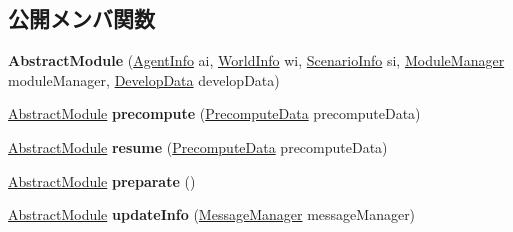 \subsection*{公開メンバ関数}
\begin{DoxyCompactItemize}
\item 
\hypertarget{classadf_1_1component_1_1module_1_1AbstractModule_a78b7aca7664343cd591f726b3b495e2d}{}\label{classadf_1_1component_1_1module_1_1AbstractModule_a78b7aca7664343cd591f726b3b495e2d} 
{\bfseries Abstract\+Module} (\hyperlink{classadf_1_1agent_1_1info_1_1AgentInfo}{Agent\+Info} ai, \hyperlink{classadf_1_1agent_1_1info_1_1WorldInfo}{World\+Info} wi, \hyperlink{classadf_1_1agent_1_1info_1_1ScenarioInfo}{Scenario\+Info} si, \hyperlink{classadf_1_1agent_1_1module_1_1ModuleManager}{Module\+Manager} module\+Manager, \hyperlink{classadf_1_1agent_1_1develop_1_1DevelopData}{Develop\+Data} develop\+Data)
\item 
\hypertarget{classadf_1_1component_1_1module_1_1AbstractModule_a26caa8a0a250dafb548c1a5d038597e7}{}\label{classadf_1_1component_1_1module_1_1AbstractModule_a26caa8a0a250dafb548c1a5d038597e7} 
\hyperlink{classadf_1_1component_1_1module_1_1AbstractModule}{Abstract\+Module} {\bfseries precompute} (\hyperlink{classadf_1_1agent_1_1precompute_1_1PrecomputeData}{Precompute\+Data} precompute\+Data)
\item 
\hypertarget{classadf_1_1component_1_1module_1_1AbstractModule_a2bcfc3ab4e5d5764a0cce91580fa6811}{}\label{classadf_1_1component_1_1module_1_1AbstractModule_a2bcfc3ab4e5d5764a0cce91580fa6811} 
\hyperlink{classadf_1_1component_1_1module_1_1AbstractModule}{Abstract\+Module} {\bfseries resume} (\hyperlink{classadf_1_1agent_1_1precompute_1_1PrecomputeData}{Precompute\+Data} precompute\+Data)
\item 
\hypertarget{classadf_1_1component_1_1module_1_1AbstractModule_af5c01c6d5397d0a87b556e28827b2508}{}\label{classadf_1_1component_1_1module_1_1AbstractModule_af5c01c6d5397d0a87b556e28827b2508} 
\hyperlink{classadf_1_1component_1_1module_1_1AbstractModule}{Abstract\+Module} {\bfseries preparate} ()
\item 
\hypertarget{classadf_1_1component_1_1module_1_1AbstractModule_aae6d14c3a06546d71a33d1108962cd0a}{}\label{classadf_1_1component_1_1module_1_1AbstractModule_aae6d14c3a06546d71a33d1108962cd0a} 
\hyperlink{classadf_1_1component_1_1module_1_1AbstractModule}{Abstract\+Module} {\bfseries update\+Info} (\hyperlink{classadf_1_1agent_1_1communication_1_1MessageManager}{Message\+Manager} message\+Manager)
\item 

\end{DoxyCompactItemize}
